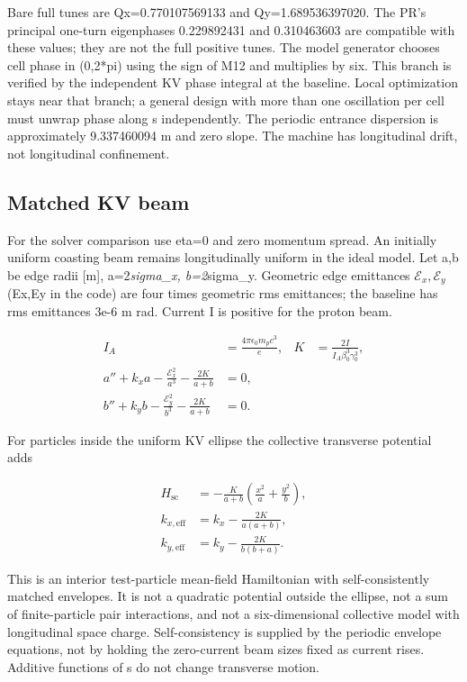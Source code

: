 \documentclass[
  11pt,
  a4paper,
]{article}
\begin{document}
Bare full tunes are Qx=0.770107569133 and Qy=1.689536397020. The PR's
principal one-turn eigenphases 0.229892431 and 0.310463603 are
compatible with these values; they are not the full positive tunes. The
model generator chooses cell phase in (0,2*pi) using the sign of M12 and
multiplies by six. This branch is verified by the independent KV phase
integral at the baseline. Local optimization stays near that branch; a
general design with more than one oscillation per cell must unwrap phase
along s independently. The periodic entrance dispersion is approximately
9.337460094 m and zero slope. The machine has longitudinal drift, not
longitudinal confinement.

\subsection{Matched KV beam}\label{matched-kv-beam}

For the solver comparison use eta=0 and zero momentum spread. An
initially uniform coasting beam remains longitudinally uniform in the
ideal model. Let a,b be edge radii {[}m{]}, a=2\emph{sigma\_x,
b=2}sigma\_y. Geometric edge emittances \(\mathcal E_x,\mathcal E_y\)
(Ex,Ey in the code) are four times geometric rms emittances; the
baseline has rms emittances 3e-6 m rad. Current I is positive for the
proton beam.

\[
\begin{aligned}
I_A&=\frac{4\pi\epsilon_0m_pc^3}{e},&K&=\frac{2I}{I_A\beta_0^3\gamma_0^3},\\
a''+k_xa-\frac{\mathcal E_x^2}{a^3}-\frac{2K}{a+b}&=0,\\
b''+k_yb-\frac{\mathcal E_y^2}{b^3}-\frac{2K}{a+b}&=0.
\end{aligned}
\]

For particles inside the uniform KV ellipse the collective transverse
potential adds

\[
\begin{aligned}
H_{\mathrm{sc}}&=-\frac{K}{a+b}\left(\frac{x^2}{a}+\frac{y^2}{b}\right),\\
k_{x,\mathrm{eff}}&=k_x-\frac{2K}{a(a+b)},\\
k_{y,\mathrm{eff}}&=k_y-\frac{2K}{b(b+a)}.
\end{aligned}
\]

This is an interior test-particle mean-field Hamiltonian with
self-consistently matched envelopes. It is not a quadratic potential
outside the ellipse, not a sum of finite-particle pair interactions, and
not a six-dimensional collective model with longitudinal space charge.
Self-consistency is supplied by the periodic envelope equations, not by
holding the zero-current beam sizes fixed as current rises. Additive
functions of s do not change transverse motion.
\end{document}
